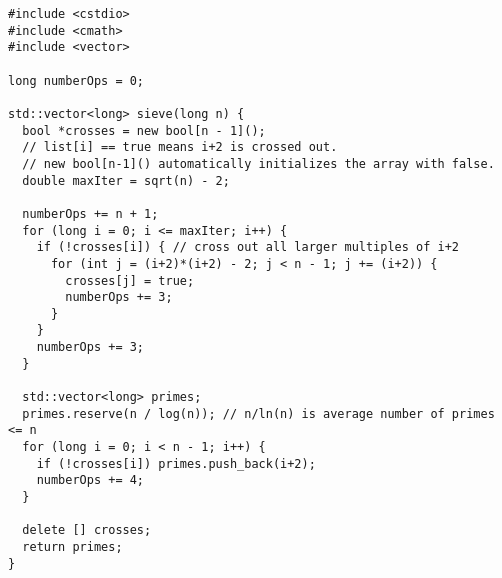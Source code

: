 \documentclass[a4paper,12pt]{article}
\begin{document}
 	\begin{lstlisting}[caption={Sequential implementation of the Sieve of Eratosthenes}, label={prg:seq_sieve}, frame={single}]
#include <cstdio>
#include <cmath>
#include <vector>

long numberOps = 0;

std::vector<long> sieve(long n) {
  bool *crosses = new bool[n - 1]();
  // list[i] == true means i+2 is crossed out.
  // new bool[n-1]() automatically initializes the array with false.
  double maxIter = sqrt(n) - 2;

  numberOps += n + 1;
  for (long i = 0; i <= maxIter; i++) {
    if (!crosses[i]) { // cross out all larger multiples of i+2
      for (int j = (i+2)*(i+2) - 2; j < n - 1; j += (i+2)) {
        crosses[j] = true;
        numberOps += 3;
      }
    }
    numberOps += 3;
  }

  std::vector<long> primes;
  primes.reserve(n / log(n)); // n/ln(n) is average number of primes <= n
  for (long i = 0; i < n - 1; i++) {
    if (!crosses[i]) primes.push_back(i+2);
    numberOps += 4;
  }

  delete [] crosses;
  return primes;
}
	\end{lstlisting}
\end{document}
